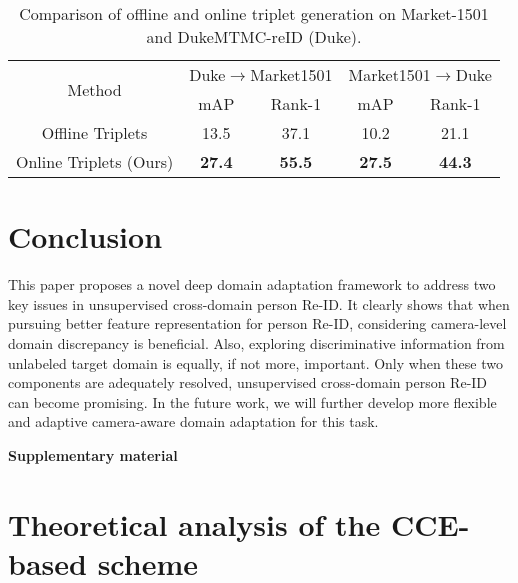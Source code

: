 \documentclass[10pt,twocolumn,letterpaper]{article}
\begin{document}
\begin{table}[htbp]
 \centering 
 \caption{Comparison of offline and online triplet generation on Market-1501 and DukeMTMC-reID (Duke).}
  \begin{adjustbox}{width=0.48\textwidth}
   \begin{tabular}{|c|cc|cc|}
   \toprule
   \multirow{2}[1]{*}{Method} & \multicolumn{2}{c|}{Duke$\rightarrow$Market1501} & \multicolumn{2}{c|}{Market1501$\rightarrow$Duke} \\
\cmidrule{2-5}         & mAP  & Rank-1 & mAP  & Rank-1 \\
     \midrule
   Offline Triplets & 13.5 & 37.1 & 10.2 & 21.1 \\
   \midrule
   Online Triplets (Ours) & \textcolor[rgb]{ 1, 0, 0}{\textbf{27.4}} & \textcolor[rgb]{ 1, 0, 0}{\textbf{55.5}} & \textcolor[rgb]{ 1, 0, 0}{\textbf{27.5}} & \textcolor[rgb]{ 1, 0, 0}{\textbf{44.3}} \\
   \bottomrule
   \end{tabular}\end{adjustbox}
 \label{tab09}\vspace*{-20pt}
\end{table}

\section{Conclusion}
This paper proposes a novel deep domain adaptation framework to address two key issues in unsupervised cross-domain person Re-ID. It clearly shows that when pursuing better feature representation for person Re-ID, considering camera-level domain discrepancy is beneficial. Also, exploring discriminative information from unlabeled target domain is equally, if not more, important. Only when these two components are adequately resolved, unsupervised cross-domain person Re-ID can become promising. In the future work, we will further develop more flexible and adaptive camera-aware domain adaptation for this task.
 
{\small


}

\textbf{\LARGE{Supplementary material}}







\setcounter{equation}{7}
\renewcommand\thesection{A1}
\section{Theoretical analysis of the CCE-based scheme}
\end{document}
